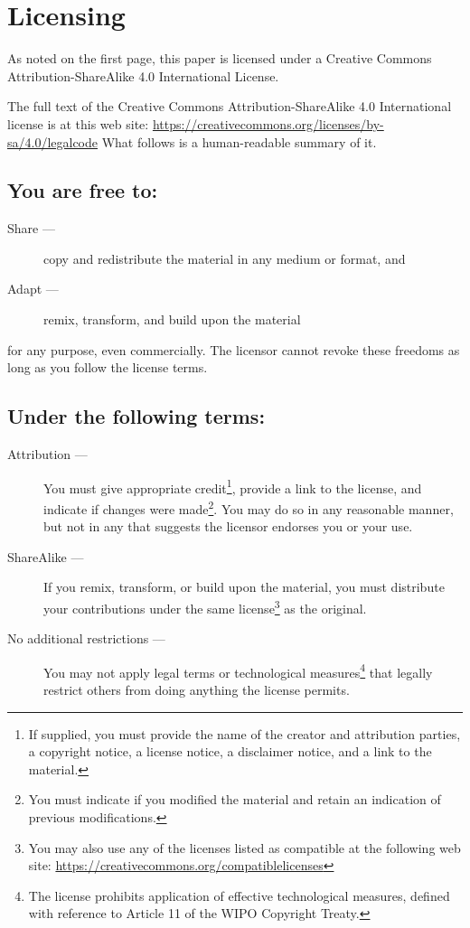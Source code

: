 \documentclass[letterpaper,twoside]{article}
\begin{document}
\section{Licensing}
\label{section:Licensing}
As noted on the first page, this paper is licensed under a Creative
Commons Attribution-ShareAlike 4.0 International License.

The full text of the Creative Commons Attribution-ShareAlike 4.0
International license is at this web site:
\href{https://creativecommons.org/licenses/by-sa/4.0/legalcode}{https://creativecommons.org/licenses/by-sa/4.0/legalcode}%
What follows is a human-readable summary of it.

\subsection{You are free to:}
\begin{description}
\item[Share ---]copy and redistribute the material in any medium or format, and
\item[Adapt ---]remix, transform, and build upon the material
\end{description}
for any purpose, even commercially.  The licensor cannot revoke these
freedoms as long as you follow the license terms.
\subsection{Under the following terms:}
\begin{description}
\item[Attribution ---]You must give appropriate credit\footnote{If supplied,
  you must provide the name of the creator and attribution parties,
  a copyright notice, a license notice, a disclaimer notice, and a link
  to the material.}, provide a link to
  the license, and indicate if changes were made\footnote{You must indicate if
    you modified the material and retain an indication of previous
    modifications.}.  You may do so in any
  reasonable manner, but not in any that suggests the licensor endorses you
  or your use.
\item[ShareAlike ---]If you remix, transform, or build upon the material,
  you must distribute your contributions under the same
  license\footnote{You may also use any of the licenses listed as compatible
    at the following web site:
    \href{https://creativecommons.org/compatiblelicenses}{https://creativecommons.org/compatiblelicenses}}
  as the original.
\item[No additional restrictions ---]You may not apply legal terms or
  technological measures\footnote{The license prohibits application of
    effective technological measures, defined with reference to Article 11
    of the WIPO Copyright Treaty.}
  that legally restrict others from doing anything
  the license permits.
\end{description}
\end{document}
